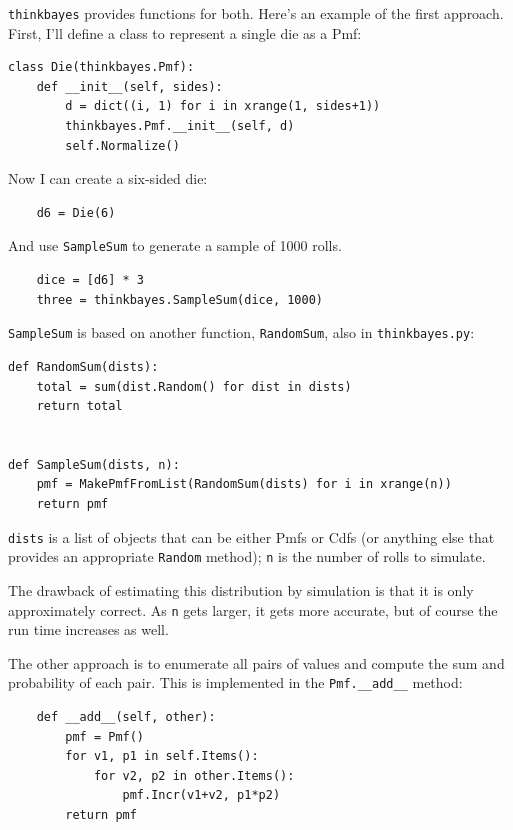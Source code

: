 \documentclass[12pt]{book}
\begin{document}
\verb"thinkbayes" provides functions for both.  Here's an example
of the first approach.  First, I'll define a class to represent
a single die as a Pmf:

\begin{verbatim}
class Die(thinkbayes.Pmf):
    def __init__(self, sides):
        d = dict((i, 1) for i in xrange(1, sides+1))
        thinkbayes.Pmf.__init__(self, d)
        self.Normalize()
\end{verbatim}

Now I can create a six-sided die:

\begin{verbatim}
    d6 = Die(6)
\end{verbatim}

And use \verb"SampleSum" to generate a sample of 1000 rolls.

\begin{verbatim}
    dice = [d6] * 3
    three = thinkbayes.SampleSum(dice, 1000)
\end{verbatim}

\verb"SampleSum" is based on another function, \verb"RandomSum",
also in \verb"thinkbayes.py":

\begin{verbatim}
def RandomSum(dists):
    total = sum(dist.Random() for dist in dists)
    return total


def SampleSum(dists, n):
    pmf = MakePmfFromList(RandomSum(dists) for i in xrange(n))
    return pmf
\end{verbatim}

\verb"dists" is a list of objects that can be either
Pmfs or Cdfs (or anything else that provides an appropriate
\verb"Random" method); \verb"n" is the number of rolls to simulate.

The drawback of estimating this distribution by simulation is that
it is only approximately correct.  As \verb"n" gets larger, it gets
more accurate, but of course the run time increases as well.

The other approach is to enumerate all pairs of values and
compute the sum and probability of each pair.  This is implemented
in the \verb"Pmf.__add__" method:

\begin{verbatim}
    def __add__(self, other):
        pmf = Pmf()
        for v1, p1 in self.Items():
            for v2, p2 in other.Items():
                pmf.Incr(v1+v2, p1*p2)
        return pmf
\end{verbatim}
\end{document}
